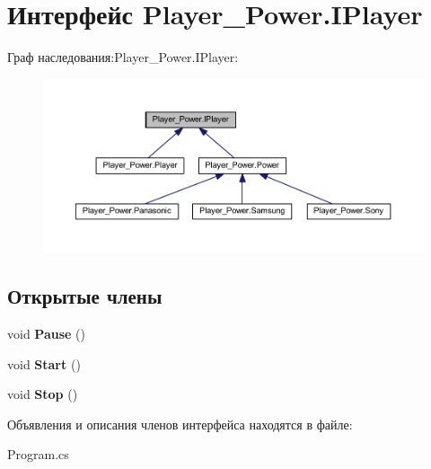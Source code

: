 \section{Интерфейс Player\-\_\-\-Power.\-I\-Player}
\label{interface_player___power_1_1_i_player}


Граф наследования\-:Player\-\_\-\-Power.\-I\-Player\-:
\nopagebreak
\begin{figure}[H]
\begin{center}
\leavevmode
\includegraphics[width=350pt]{interface_player___power_1_1_i_player__inherit__graph}
\end{center}
\end{figure}
\subsection*{Открытые члены}
\begin{DoxyCompactItemize}
\item 
void {\bfseries Pause} ()\label{interface_player___power_1_1_i_player_a80b3a2311cf29cb5d11715246d33fc05}

\item 
void {\bfseries Start} ()\label{interface_player___power_1_1_i_player_a7836ccd9e36c42524aee2e3392823cb0}

\item 
void {\bfseries Stop} ()\label{interface_player___power_1_1_i_player_ab1020806df8f4b7d0f4c58a2c2f6e037}

\end{DoxyCompactItemize}


Объявления и описания членов интерфейса находятся в файле\-:\begin{DoxyCompactItemize}
\item 
Program.\-cs\end{DoxyCompactItemize}
